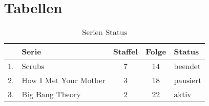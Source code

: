 \section{Tabellen}

\begin{table}[b]
	\caption{Serien Status}
	\begin{tabular}{|c l|c|c|l|}
		\hline 
		& Serie & Staffel & Folge & Status \\ 
		\hline
		\hline 
		1. & Scrubs & 7 & 14 & beendet \\ 
		\hline 
		2. & How I Met Your Mother & 3 & 18 & pausiert \\ 
		\hline 
		3. & Big Bang Theory & 2 & 22 & aktiv \\ 
		\hline 
	\end{tabular}
\end{table}

